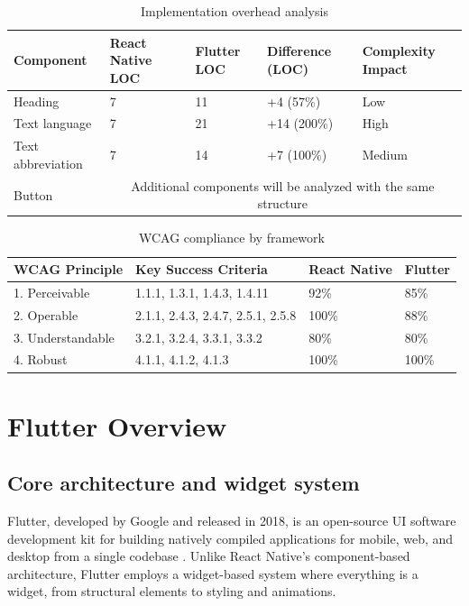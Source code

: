 \begin{table}[ht]
\caption{Implementation overhead analysis}
\label{tab:implementation_overhead_comparison}
\centering
\begin{tabular}{|p{2.5cm}|p{2.5cm}|p{2.5cm}|p{2.5cm}|p{2.5cm}|}
\hline
\textbf{Component} & \textbf{React Native LOC} & \textbf{Flutter LOC} & \textbf{Difference (LOC)} & \textbf{Complexity Impact} \\
\hline
Heading & 7 & 11 & +4 (57\%) & Low \\
\hline
Text language & 7 & 21 & +14 (200\%) & High \\
\hline
Text abbreviation & 7 & 14 & +7 (100\%) & Medium \\
\hline
Button & \multicolumn{4}{c|}{Additional components will be analyzed with the same structure} \\
\hline
\end{tabular}
\end{table}

\begin{table}[ht]
\caption{WCAG compliance by framework}
\label{tab:wcag_compliance_comparison}
\centering
\begin{tabular}{|p{2.5cm}|p{5cm}|p{3cm}|p{3cm}|}
\hline
\textbf{WCAG Principle} & \textbf{Key Success Criteria} & \textbf{React Native} & \textbf{Flutter} \\
\hline
1. Perceivable & 1.1.1, 1.3.1, 1.4.3, 1.4.11 & 92\% & 85\% \\
\hline
2. Operable & 2.1.1, 2.4.3, 2.4.7, 2.5.1, 2.5.8 & 100\% & 88\% \\
\hline
3. Understandable & 3.2.1, 3.2.4, 3.3.1, 3.3.2 & 80\% & 80\% \\
\hline
4. Robust & 4.1.1, 4.1.2, 4.1.3 & 100\% & 100\% \\
\hline
\end{tabular}
\end{table}

\section{Flutter Overview}
\subsection{Core architecture and widget system}
Flutter, developed by Google and released in 2018, is an open-source UI software development kit for building natively compiled applications for mobile, web, and desktop from a single codebase \cite{site:flutter}. Unlike React Native's component-based architecture, Flutter employs a widget-based system where everything is a widget, from structural elements to styling and animations.


